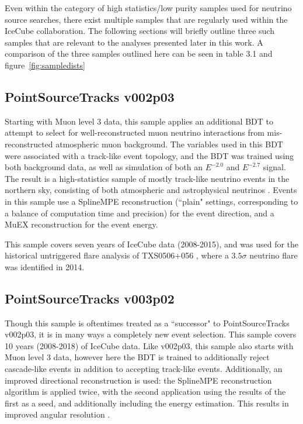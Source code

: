 Even within the category of high statistics/low purity samples used for neutrino source searches, there exist multiple samples that are regularly used within the IceCube collaboration. The following sections will briefly outline three such samples that are relevant to the analyses presented later in this work.  A comparison of the three samples outlined here can be seen in table 3.1 and figure~\ref{fig:sampledists}

\subsection{PointSourceTracks v002p03}
Starting with Muon level 3 data, this sample applies an additional BDT to attempt to select for well-reconstructed muon neutrino interactions from mis-reconstructed atmospheric muon background. The variables used in this BDT were associated with a track-like event topology, and the BDT was trained using both background data, as well as simulation of both an $E^{-2.0}$ and $E^{-2.7}$ signal. The result is a high-statistics sample of mostly track-like neutrino events in the northern sky, consisting of both atmospheric and astrophysical neutrinos \cite{7yr_tint}. Events in this sample use a SplineMPE reconstruction (``plain" settings, corresponding to a balance of computation time and precision) for the event direction, and a MuEX reconstruction for the event energy.


This sample covers seven years of IceCube data (2008-2015), and was used for the historical untriggered flare analysis of TXS0506+056 \cite{TXS_Archival}, where a $3.5\sigma$ neutrino flare was identified in 2014. 

\subsection{PointSourceTracks v003p02}
Though this sample is oftentimes treated as a ``successor" to PointSourceTracks v002p03, it is in many ways a completely new event selection. This sample covers 10 years (2008-2018) of IceCube data. Like v002p03, this sample also starts with Muon level 3 data, however here the BDT is trained to additionally reject cascade-like events in addition to accepting track-like events. Additionally, an improved directional reconstruction is used: the SplineMPE reconstruction algorithm is applied twice, with the second application using the results of the first as a seed, and additionally including the energy estimation. This results in improved angular resolution \cite{TessaThesis}.

